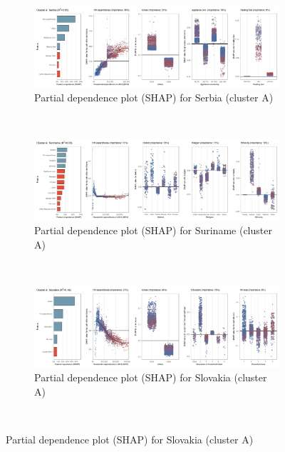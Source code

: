 \begin{figure}[ht!]\ContinuedFloat
    \centering
   \begin{subfigure}[b]{\textwidth}
    \centering
         \caption{Partial dependence plot (SHAP) for Serbia (cluster A)}
         \label{fig:5b_SRB}
         \includegraphics[width=\textwidth]{Figure 5b/Figure_5b_SRB}
         \end{subfigure}
    \\
    \vspace{0.5cm}
    \begin{subfigure}[b]{\textwidth}
   \centering
         \caption{Partial dependence plot (SHAP) for Suriname (cluster A)}
         \label{fig:5b_SUR}
         \includegraphics[width=\textwidth]{Figure 5b/Figure_5b_SUR}
         \end{subfigure}
    \\
    \vspace{0.5cm}
   \begin{subfigure}[b]{\textwidth}
         \centering
         \caption{Partial dependence plot (SHAP) for Slovakia (cluster A)}
         \label{fig:5b_SVK}
         \includegraphics[width=\textwidth]{Figure 5b/Figure_5b_SVK}
         \end{subfigure}
    \\
    \vspace{0.5cm}
   

\end{figure}
